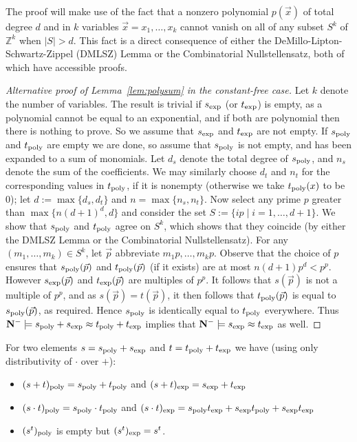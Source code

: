 \documentclass[eqnor,reqno]{amsart}
\theoremstyle{plain}
\theoremstyle{definition}
\begin{document}
The proof will make use of the fact that a nonzero polynomial $p(\vec{x})$ of total degree $d$ and in $k$ variables $\vec{x}=x_1,\dots,x_k$ cannot vanish on all of any subset $S^k$ of $\mathbb{Z}^k$ when $|S|>d$.  
This fact is a direct consequence of either the DeMillo-Lipton-Schwartz-Zippel (DMLSZ) Lemma or the Combinatorial Nullstellensatz, both of which have accessible proofs.
\begin{proof}[Alternative proof of Lemma~\ref{lem:polysum} in the constant-free case]
Let $k$ denote the number of variables.
The result is trivial if $s_{\rm exp}$ (or $t_{\rm exp}$) is empty, as a polynomial cannot be equal to an exponential, and if both are polynomial then there is nothing to prove.  
So we assume that $s_{\rm exp}$ and $t_{\rm exp}$ are not empty.  
If $s_{\rm poly}$ and $t_{\rm poly}$ are empty we are done, so assume that $s_{\rm poly}$ is not empty, and has been expanded to a sum of monomials.  
 Let $d_s$ denote the total degree of  $s_{\rm poly}$, and $n_s$ denote the sum of the coefficients.  
We may similarly choose $d_t$ and $n_t$ for the corresponding values in $t_{\rm poly}$, if it is nonempty (otherwise we take $t_{\rm poly}(x)$ to be $0$); let $d:=\max\{d_s,d_t\}$ and $n=\max\{n_s,n_t\}$.
Now select any prime $p$ greater than $\max\{n(d+1)^d,d\}$ and consider the set $S:=\{ip\mid i=1,\dots,d+1\}$.  
We show that $s_{\rm poly}$ and $t_{\rm poly}$ agree on $S^k$, which shows that they coincide (by either the DMLSZ Lemma or the Combinatorial Nullstellensatz).
For any $(m_1,\dots,m_k) \in S^k$, let $\vec{p}$ abbreviate $m_1p,\dots,m_kp$.
Observe that the choice of $p$ ensures that $s_{\rm poly}(\vec{p})$ and $t_{\rm poly}(\vec{p})$ (if it exists) are at most $n(d+1)p^d<p^p$.  
However $s_{\rm exp}(\vec{p})$  and $t_{\rm exp}(\vec{p})$ are multiples of $p^p$.  
It follows that $s(\vec{p})$ is not a multiple of $p^p$, and as $s(\vec{p})=t(\vec{p})$, it then follows that $t_{\rm poly}(\vec{p})$ is equal to $s_{\rm poly}(\vec{p})$, as required.
Hence $s_{\rm poly}$ is identically equal to $t_{\rm poly}$ everywhere.
Thus ${\bf N}^-\models s_{\rm poly}+s_{\rm exp}\approx t_{\rm poly}+t_{\rm exp}$ implies that ${\bf N}^-\models s_{\rm exp}\approx t_{\rm exp}$ as well.
\end{proof}
For two elements $s=s_{\rm poly}+s_{\rm exp}$ and $t=t_{\rm poly}+t_{\rm exp}$ we have (using only distributivity of $\cdot$ over $+$):
\begin{itemize}
	\item $(s+t)_{\rm poly} = s_{\rm poly}+t_{\rm poly}$ and $(s+t)_{\rm exp}=s_{\rm exp}+t_{\rm exp}$
	\item $(s\cdot t)_{\rm poly} = s_{\rm poly}\cdot t_{\rm poly}$ and $(s\cdot t)_{\rm exp}=s_{\rm poly}t_{\rm exp}+s_{\rm exp}t_{\rm poly}+s_{\rm exp}t_{\rm exp}$
	\item $(s^t)_{\rm poly}$ is empty but $(s^t)_{\rm exp}=s^t$.
\end{itemize}
\end{document}
